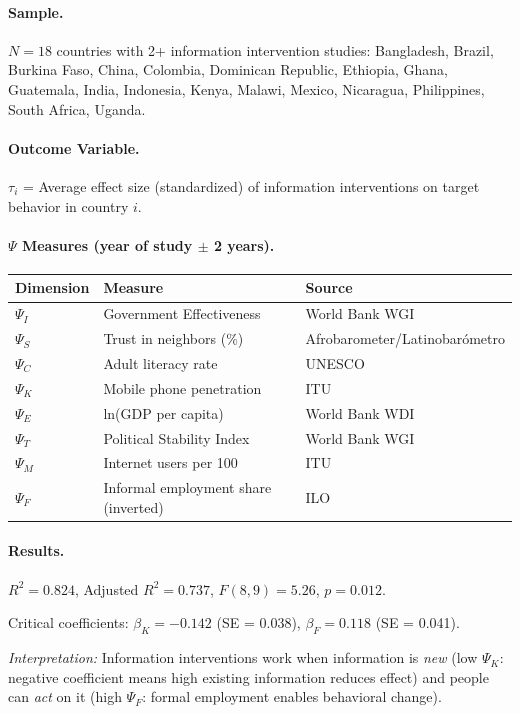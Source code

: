 \documentclass[12pt,a4paper]{article}
\begin{document}
\paragraph{Sample.}
$N = 18$ countries with 2+ information intervention studies: Bangladesh, Brazil, Burkina Faso, China, Colombia, Dominican Republic, Ethiopia, Ghana, Guatemala, India, Indonesia, Kenya, Malawi, Mexico, Nicaragua, Philippines, South Africa, Uganda.

\paragraph{Outcome Variable.}
$\tau_i$ = Average effect size (standardized) of information interventions on target behavior in country $i$.

\paragraph{$\Psi$ Measures (year of study $\pm$ 2 years).}
\begin{center}
\small
\begin{tabular}{@{}lll@{}}
\toprule
\textbf{Dimension} & \textbf{Measure} & \textbf{Source} \\
\midrule
$\Psi_I$ & Government Effectiveness & World Bank WGI \\
$\Psi_S$ & Trust in neighbors (\%) & Afrobarometer/Latinobarómetro \\
$\Psi_C$ & Adult literacy rate & UNESCO \\
$\Psi_K$ & Mobile phone penetration & ITU \\
$\Psi_E$ & ln(GDP per capita) & World Bank WDI \\
$\Psi_T$ & Political Stability Index & World Bank WGI \\
$\Psi_M$ & Internet users per 100 & ITU \\
$\Psi_F$ & Informal employment share (inverted) & ILO \\
\bottomrule
\end{tabular}
\end{center}

\paragraph{Results.}
$R^2 = 0.824$, Adjusted $R^2 = 0.737$, $F(8,9) = 5.26$, $p = 0.012$.

Critical coefficients: $\beta_K = -0.142$ (SE = 0.038), $\beta_F = 0.118$ (SE = 0.041).

\textit{Interpretation:} Information interventions work when information is \textit{new} (low $\Psi_K$: negative coefficient means high existing information reduces effect) and people can \textit{act} on it (high $\Psi_F$: formal employment enables behavioral change).
\end{document}
